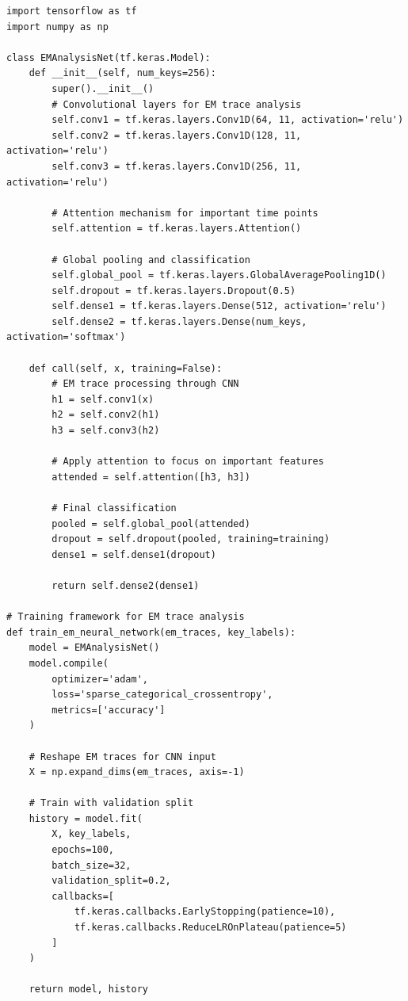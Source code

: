 \documentclass[11pt,a4paper]{article}
\theoremstyle{definition}
\begin{document}
\begin{lstlisting}[caption={Deep Learning EM Attack Framework}]
import tensorflow as tf
import numpy as np

class EMAnalysisNet(tf.keras.Model):
    def __init__(self, num_keys=256):
        super().__init__()
        # Convolutional layers for EM trace analysis
        self.conv1 = tf.keras.layers.Conv1D(64, 11, activation='relu')
        self.conv2 = tf.keras.layers.Conv1D(128, 11, activation='relu')
        self.conv3 = tf.keras.layers.Conv1D(256, 11, activation='relu')
        
        # Attention mechanism for important time points
        self.attention = tf.keras.layers.Attention()
        
        # Global pooling and classification
        self.global_pool = tf.keras.layers.GlobalAveragePooling1D()
        self.dropout = tf.keras.layers.Dropout(0.5)
        self.dense1 = tf.keras.layers.Dense(512, activation='relu')
        self.dense2 = tf.keras.layers.Dense(num_keys, activation='softmax')
    
    def call(self, x, training=False):
        # EM trace processing through CNN
        h1 = self.conv1(x)
        h2 = self.conv2(h1)
        h3 = self.conv3(h2)
        
        # Apply attention to focus on important features
        attended = self.attention([h3, h3])
        
        # Final classification
        pooled = self.global_pool(attended)
        dropout = self.dropout(pooled, training=training)
        dense1 = self.dense1(dropout)
        
        return self.dense2(dense1)

# Training framework for EM trace analysis
def train_em_neural_network(em_traces, key_labels):
    model = EMAnalysisNet()
    model.compile(
        optimizer='adam',
        loss='sparse_categorical_crossentropy',
        metrics=['accuracy']
    )
    
    # Reshape EM traces for CNN input
    X = np.expand_dims(em_traces, axis=-1)
    
    # Train with validation split
    history = model.fit(
        X, key_labels,
        epochs=100,
        batch_size=32,
        validation_split=0.2,
        callbacks=[
            tf.keras.callbacks.EarlyStopping(patience=10),
            tf.keras.callbacks.ReduceLROnPlateau(patience=5)
        ]
    )
    
    return model, history
\end{lstlisting}
\end{document}
